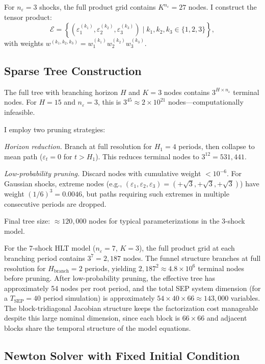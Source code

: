 \documentclass[12pt]{article}
\theoremstyle{plain}
\theoremstyle{definition}
\theoremstyle{remark}
\newcommand{\eps}{\varepsilon}
\begin{document}
For $n_\eps=3$ shocks, the full product grid contains $K^{n_\eps} = 27$ nodes. I construct the tensor product:
\begin{equation}
\mathcal{E} = \left\{ (\eps_1^{(k_1)}, \eps_2^{(k_2)}, \eps_3^{(k_3)}) \mid k_1, k_2, k_3 \in \{1,2,3\} \right\},
\end{equation}
with weights $w^{(k_1,k_2,k_3)} = w_1^{(k_1)} w_2^{(k_2)} w_3^{(k_3)}$.


\subsection{Sparse Tree Construction}

The full tree with branching horizon $H$ and $K=3$ nodes contains $3^{H \times n_\eps}$ terminal nodes. For $H=15$ and $n_\eps=3$, this is $3^{45} \approx 2 \times 10^{21}$ nodes—computationally infeasible.

I employ two pruning strategies:

\textit{Horizon reduction.} Branch at full resolution for $H_1 = 4$ periods, then collapse to mean path ($\eps_t=0$ for $t > H_1$). This reduces terminal nodes to $3^{12} = 531{,}441$.

\textit{Low-probability pruning.} Discard nodes with cumulative weight $< 10^{-6}$. For Gaussian shocks, extreme nodes (e.g., $(\eps_1, \eps_2, \eps_3) = (+\sqrt{3}, +\sqrt{3}, +\sqrt{3})$) have weight $(1/6)^3 = 0.0046$, but paths requiring such extremes in multiple consecutive periods are dropped.

Final tree size: $\approx 120{,}000$ nodes for typical parameterizations in the 3-shock model.

For the 7-shock HLT model ($n_\eps = 7$, $K=3$), the full product grid at each branching period contains $3^7 = 2{,}187$ nodes. The funnel structure branches at full resolution for $H_{\text{branch}} = 2$ periods, yielding $2{,}187^2 \approx 4.8 \times 10^6$ terminal nodes before pruning. After low-probability pruning, the effective tree has approximately 54 nodes per root period, and the total SEP system dimension (for a $T_{\text{SEP}}=40$ period simulation) is approximately $54 \times 40 \times 66 \approx 143{,}000$ variables. The block-tridiagonal Jacobian structure keeps the factorization cost manageable despite this large nominal dimension, since each block is $66 \times 66$ and adjacent blocks share the temporal structure of the model equations.


\subsection{Newton Solver with Fixed Initial Condition}
\end{document}
